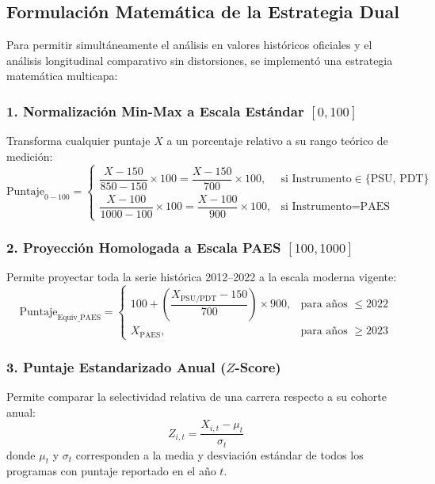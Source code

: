 \documentclass[11pt,a4paper]{article}
\begin{document}
\subsection{Formulación Matemática de la Estrategia Dual}
Para permitir simultáneamente el análisis en valores históricos oficiales y el análisis longitudinal comparativo sin distorsiones, se implementó una estrategia matemática multicapa:

\subsubsection{1. Normalización Min-Max a Escala Estándar $[0, 100]$}
Transforma cualquier puntaje $X$ a un porcentaje relativo a su rango teórico de medición:
\begin{equation}
\text{Puntaje}_{0-100} = 
\begin{cases}
\dfrac{X - 150}{850 - 150} \times 100 = \dfrac{X - 150}{700} \times 100, & \text{si Instrumento} \in \{\text{PSU, PDT}\} \\[3mm]
\dfrac{X - 100}{1000 - 100} \times 100 = \dfrac{X - 100}{900} \times 100, & \text{si Instrumento} = \text{PAES}
\end{cases}
\end{equation}

\subsubsection{2. Proyección Homologada a Escala PAES $[100, 1000]$}
Permite proyectar toda la serie histórica 2012--2022 a la escala moderna vigente:
\begin{equation}
\text{Puntaje}_{\text{Equiv\_PAES}} = 
\begin{cases}
100 + \left(\dfrac{X_{\text{PSU/PDT}} - 150}{700}\right) \times 900, & \text{para años } \le 2022 \\[3mm]
X_{\text{PAES}}, & \text{para años } \ge 2023
\end{cases}
\end{equation}

\subsubsection{3. Puntaje Estandarizado Anual ($Z$-Score)}
Permite comparar la selectividad relativa de una carrera respecto a su cohorte anual:
\begin{equation}
Z_{i, t} = \frac{X_{i, t} - \mu_t}{\sigma_t}
\end{equation}
donde $\mu_t$ y $\sigma_t$ corresponden a la media y desviación estándar de todos los programas con puntaje reportado en el año $t$.
\end{document}
